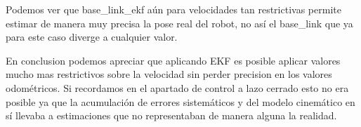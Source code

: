 







Podemos ver que base\_link\_ekf aún para velocidades tan restrictivas permite estimar de manera muy precisa la pose real del robot, no así el base\_link que ya para este caso diverge a cualquier valor.

En conclusion podemos apreciar que aplicando EKF es posible aplicar valores mucho mas restrictivos sobre la velocidad sin perder precision en los valores odométricos. Si recordamos en el apartado de control a lazo cerrado esto no era posible ya que la acumulación de errores sistemáticos y del modelo cinemático en sí llevaba a estimaciones que no representaban de manera alguna la realidad. 


